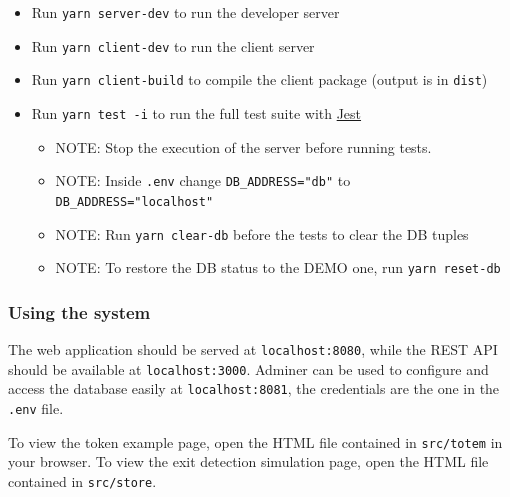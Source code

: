\documentclass[
]{article}
\begin{document}
\begin{itemize}

\item
  Run \texttt{yarn\ server-dev} to run the developer server
\item
  Run \texttt{yarn\ client-dev} to run the client server
\item
  Run \texttt{yarn\ client-build} to compile the client package (output
  is in \texttt{dist})
\item
  Run \texttt{yarn\ test -i} to run the full test suite with
  \href{https://jestjs.io}{Jest}
  \begin{itemize}
    \item   NOTE: Stop the execution of the server before running tests.
    \item   NOTE: Inside \texttt{.env} change \texttt{DB\_ADDRESS="db"} to \texttt{DB\_ADDRESS="localhost"}
    \item   NOTE: Run \texttt{yarn\ clear-db} before the tests to clear the DB tuples
    \item   NOTE: To restore the DB status to the DEMO one, run \texttt{yarn\ reset-db}
  \end{itemize}
\end{itemize}

\subsubsection{Using the system}
The web application should be served at \texttt{localhost:8080}, while the REST API should be available at \texttt{localhost:3000}. Adminer can be used to configure and access the database easily at \texttt{localhost:8081}, the credentials are the one in the \texttt{.env} file.

To view the token example page, open the HTML file contained in \texttt{src/totem} in your browser. To view the exit detection simulation page, open the HTML file contained in \texttt{src/store}.
\end{document}
